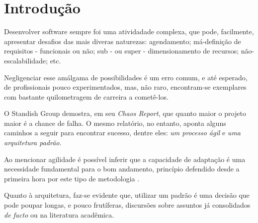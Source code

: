 \section{Introdução}

  Desenvolver software sempre foi uma atividadade complexa, que pode, facilmente,  apresentar desafios das mais diveras naturezas: agendamento; má-definição de  requisitos - funcionais ou não; sub - ou super - dimensionamento de recursos; não-escalabilidade; etc.

  Negligenciar esse amálgama de possibilidades é um erro comum, e até esperado, de profissionais pouco experimentados, mas, não raro, encontram-se exemplares com bastante quilometragem de carreira a cometê-los.

  O Standish Group demostra, em seu \emph{Chaos Report}\cite{ChaosReport2015}, que quanto maior o projeto maior é a chance de falha. O mesmo relatório, no entanto, aponta alguns caminhos a seguir para encontrar sucesso, dentre eles: \emph{um processo ágil} e \emph{uma arquitetura padrão}.

  Ao mencionar agilidade é possível inferir que a capacidade de adaptação é uma  necessidade fundamental para o bom andamento, princípio defendido desde a  primeira hora por este tipo de metodologia \cite{ManifestoAgil2001}.

  Quanto à arquitetura, faz-se evidente que, utilizar um padrão é uma decisão que pode poupar longas, e pouco frutíferas, discursões sobre assuntos já consolidados \emph{de facto} ou na literatura acadêmica.
